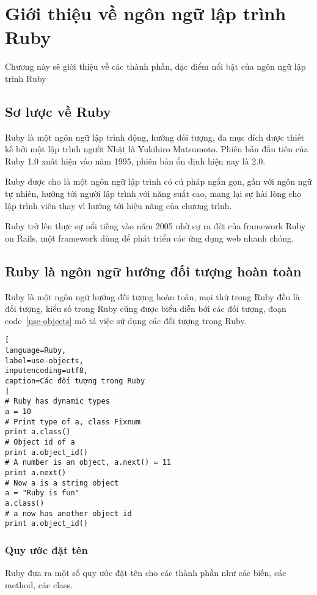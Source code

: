 \chapter{Giới thiệu về ngôn ngữ lập trình Ruby}
Chương này sẽ giới thiệu về các thành phần, đặc điểm nổi bật của ngôn ngữ lập trình Ruby

\section{Sơ lược về Ruby}
Ruby là một ngôn ngữ lập trình động, hướng đối tượng, đa mục đích được thiết kế bởi một lập trình người Nhật là Yukihiro Matsumoto. Phiên bản đầu tiên của Ruby 1.0 xuất hiện vào năm 1995, phiên bản ổn định hiện nay là 2.0.\newline

Ruby được cho là một ngôn ngữ lập trình có cú pháp ngắn gọn, gần với ngôn ngữ tự nhiên, hướng tới người lập trình với năng suất cao, mang lại sự hài lòng cho lập trình viên thay vì hướng tới hiệu năng của chương trình. \newline

Ruby trở lên thực sự nổi tiếng vào năm 2005 nhờ sự ra đời của framework Ruby on Rails, một framework dùng để phát triển các ứng dụng web nhanh chóng.

\section{Ruby là ngôn ngữ hướng đối tượng hoàn toàn} 
Ruby là một ngôn ngữ hướng đối tượng hoàn toàn, mọi thứ trong Ruby đều là đối tượng, kiểu số trong Ruby cũng được biểu diễn bởi các đối tượng, đoạn code~\ref{use-objects} mô tả việc sử dụng các đối tượng trong Ruby.
\begin{lstlisting}[
language=Ruby,
label=use-objects,
inputencoding=utf8,
caption=Các đối tượng trong Ruby
]
# Ruby has dynamic types
a = 10
# Print type of a, class Fixnum
print a.class()
# Object id of a
print a.object_id()
# A number is an object, a.next() = 11
print a.next()
# Now a is a string object 
a = "Ruby is fun"
a.class()
# a now has another object id
print a.object_id()
\end{lstlisting}

\subsection{Quy ước đặt tên}
Ruby đưa ra một số quy ước đặt tên cho các thành phần như các biến, các method, các class.\newline

